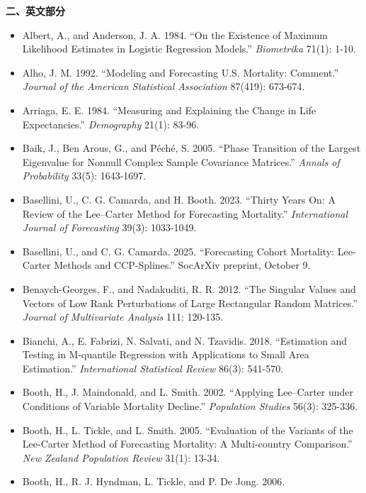 \documentclass[UTF8, fontset=macnew, a4paper, 12pt]{ctexart}
\begin{document}
\vspace{4pt}
\noindent\textbf{二、英文部分}
\begin{itemize}[leftmargin=2em, label={}, itemsep=3pt]
  \item[] Albert, A., and Anderson, J. A. 1984. ``On the Existence of Maximum
        Likelihood Estimates in Logistic Regression Models.'' \textit{Biometrika}
        71(1): 1-10.
  \item[] Alho, J. M. 1992. ``Modeling and Forecasting U.S. Mortality:
        Comment.'' \textit{Journal of the American Statistical Association}
        87(419): 673-674.
  \item[] Arriaga, E. E. 1984. ``Measuring and Explaining the Change in Life
        Expectancies.'' \textit{Demography} 21(1): 83-96.
  \item[] Baik, J., Ben Arous, G., and P\'{e}ch\'{e}, S. 2005. ``Phase Transition of
        the Largest Eigenvalue for Nonnull Complex Sample Covariance Matrices.''
        \textit{Annals of Probability} 33(5): 1643-1697.
  \item[] Basellini, U., C. G. Camarda, and H. Booth. 2023. ``Thirty Years On:
        A Review of the Lee--Carter Method for Forecasting Mortality.''
        \textit{International Journal of Forecasting} 39(3): 1033-1049.
  \item[] Basellini, U., and C. G. Camarda. 2025. ``Forecasting Cohort Mortality:
        Lee-Carter Methods and CCP-Splines.'' SocArXiv preprint, October 9.
  \item[] Benaych-Georges, F., and Nadakuditi, R. R. 2012. ``The Singular Values and
        Vectors of Low Rank Perturbations of Large Rectangular Random Matrices.''
        \textit{Journal of Multivariate Analysis} 111: 120-135.
  \item[] Bianchi, A., E. Fabrizi, N. Salvati, and N. Tzavidis. 2018.
        ``Estimation and Testing in M-quantile Regression with Applications to
        Small Area Estimation.'' \textit{International Statistical Review}
        86(3): 541-570.
  \item[] Booth, H., J. Maindonald, and L. Smith. 2002. ``Applying Lee--Carter
        under Conditions of Variable Mortality Decline.''
        \textit{Population Studies} 56(3): 325-336.
  \item[] Booth, H., L. Tickle, and L. Smith. 2005. ``Evaluation of the
        Variants of the Lee-Carter Method of Forecasting Mortality:
        A Multi-country Comparison.''
        \textit{New Zealand Population Review} 31(1): 13-34.
  \item[] Booth, H., R. J. Hyndman, L. Tickle, and P. De Jong. 2006.

\end{itemize}
\end{document}
